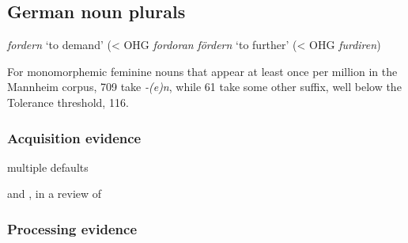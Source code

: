 \subsection{German noun plurals}

\citet{Wright1907}
\citet{Twaddell1938}
\citet{Bach1970,Wiese1987}

\citet{Hieble1957}
\citet{Zwicky1967}
\citet{Lieber1980}
\citet{Wurzel1970,Wurzel1981}
\citet{LessenKloeke1982}
\citet{Voyles1992}
\citet{Janda1998}

\emph{fordern} `to demand' (< OHG \emph{fordoran}
\emph{fördern} `to further' (< OHG \emph{furdiren})

For monomorphemic feminine nouns that appear at least once per million in the Mannheim corpus, 709 take \emph{-(e)n}, while 61 take some other suffix, well below the Tolerance threshold, 116. 

\subsubsection{Acquisition evidence}

multiple defaults
\citet{Wunderlich1999}
\citet{Bech1963}

\citet{Kopcke1988,Dressler1999,Indefrey1999,Wiese1999,Spreng2004}

\citet{Mills1986}

\citet{Park1978} %
\citet{Kopcke1998} %
\citet{Szagun2001} %
\citet{Clahsen1992} %

\citet{Kauschke2011} %
\citet{Bittner2000} %
\citet{Gawlitzek-Maiwald1994} %

\citet{Laaha2006} %
\citet{Schaner-Wolles1988} %
\citet{Mugdan1977} %
\citet{MacWhinney1978} %
\citet{Spreng2004} %
\citet{Niedeggen-Bartke1999} %
\citet{Ewers1999} %


\citet{Miller1979}
\citet{Wagner1985}
\citet{Weissenborn1986}

\citet{Bach1970,Wiese1996a}
\citet{Janda1998}
and \citet{Hall1997}, in a review of \citet{Wiese1996b}

\subsubsection{Processing evidence}

\citet{Sonnenstuhl2002}

\citet{Weyerts1997}
